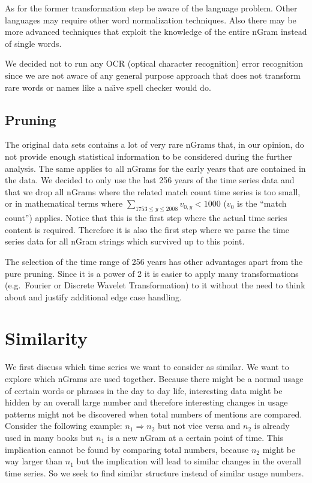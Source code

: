 As for the former transformation step be aware of the language problem. Other languages may require other word normalization techniques. Also there may be more advanced techniques that exploit the knowledge of the entire nGram instead of single words.

We decided not to run any OCR (optical character recognition) error recognition since we are not aware of any general purpose approach that does not transform rare words or names like a na\"{\i}ve spell checker would do.


\subsection{Pruning}
\label{ssec:baseline:data:prune}
The original data sets contains a lot of very rare nGrams that, in our opinion, do not provide enough statistical information to be considered during the further analysis. The same applies to all nGrams for the early years that are contained in the data. We decided to only use the last \num{256} years of the time series data and that we drop all nGrams where the related match count time series is too small, or in mathematical terms where $\sum_{1753 \leq y \leq 2008} v_{0, y} < 1000$ ($v_0$ is the \enquote{match count}) applies. Notice that this is the first step where the actual time series content is required. Therefore it is also the first step where we parse the time series data for all nGram strings which survived up to this point.

The selection of the time range of \num{256} years has other advantages apart from the pure pruning. Since it is a power of \num{2} it is easier to apply many transformations (e.g.\ Fourier or Discrete Wavelet Transformation) to it without the need to think about and justify additional edge case handling.



\section{Similarity}
\label{sec:baseline:sim}
We first discuss which time series we want to consider as similar. We want to explore which nGrams are used together. Because there might be a normal usage of certain words or phrases in the day to day life, interesting data might be hidden by an overall large number and therefore interesting changes in usage patterns might not be discovered when total numbers of mentions are compared. Consider the following example: $n_1 \Rightarrow n_2$ but not vice versa and $n_2$ is already used in many books but $n_1$ is a new nGram at a certain point of time. This implication cannot be found by comparing total numbers, because $n_2$ might be way larger than $n_1$ but the implication will lead to similar changes in the overall time series. So we seek to find similar structure instead of similar usage numbers.

